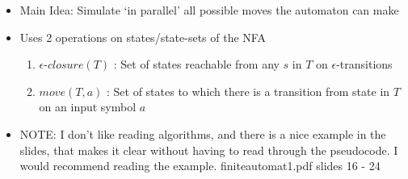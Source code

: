 \documentclass[11pt]{article}
\begin{document}
\begin{itemize}
 \item Main Idea: Simulate `in parallel' all possible moves the automaton can make
 \item Uses 2 operations on states/state-sets of the NFA
 \begin{enumerate}
  \item $\epsilon$-$closure(T)$ : Set of states reachable from any $s$ in $T$ on $\epsilon$-transitions
  \item $move(T, a)$ : Set of states to which there is a transition from state in $T$ on an input symbol $a$
 \end{enumerate}
 \item NOTE: I don't like reading algorithms, and there is a nice example in the slides, that makes it clear without having to read through the pseudocode. I would recommend reading the example. finiteautomat1.pdf slides 16 - 24
\end{itemize}
\end{document}
